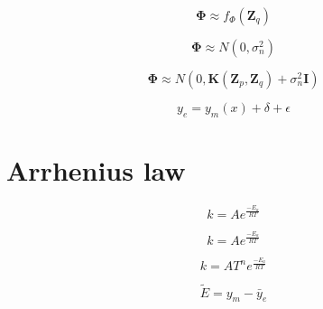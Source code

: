 \documentclass[20pt,twocolumn]{article}
\begin{document}
\begin{equation*}
\bm{\Phi} \approx f_{\Phi} (\bm{Z}_q)
\end{equation*}

\begin{equation*}
\bm{\Phi} \approx N (0, \sigma_{n}^2)
\end{equation*}

\begin{equation*}
\bm{\Phi} \approx N (0, \bm{K}(\bm{Z}_p, \bm{Z}_q) + \sigma_{n}^2 \bm{I})
\end{equation*}


\begin{equation*}
y_e = y_m(x) + \delta + \epsilon
\end{equation*}

\section{Arrhenius law}

\begin{equation*}
k = A e^{\frac{-E_a}{R T}}
\end{equation*}

\begin{equation*}
k = A e^{\frac{-E_a}{R T}}
\end{equation*}

\begin{equation*}
k = A T^n e^{\frac{-E_a}{R T}}
\end{equation*}



\begin{equation*}
\tilde{E} = y_m - \bar{y}_e
\end{equation*}
\end{document}
